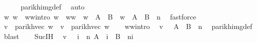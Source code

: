 \begin{isabellebody}
\ \ \ \ \isamarkupfalse%
\ parikh{\isacharunderscore}{\kern0pt}img{\isacharunderscore}{\kern0pt}def\ \isamarkupfalse%
\ auto\isanewline
\ \ \isamarkupfalse%
\ \isamarkupfalse%
\ w{}\ w{}\ \ w{}{\isacharunderscore}{\kern0pt}w{}{\isacharunderscore}{\kern0pt}intro{\isacharcolon}{\kern0pt}\ {\isachardoublequoteopen}w\ {\isacharequal}{\kern0pt}\ w{}{\isacharat}{\kern0pt}w{}\ {\isasymand}\ w{}\ {\isasymin}\ A\ {\isasymunion}\ B\ {\isasymand}\ w{}\ {\isasymin}\ {\isacharparenleft}{\kern0pt}A\ {\isasymunion}\ B{\isacharparenright}{\kern0pt}\ {\isacharcircum}{\kern0pt}{\isacharcircum}{\kern0pt}\ n{\isachardoublequoteclose}\ \isamarkupfalse%
\ fastforce\isanewline
\ \ \isamarkupfalse%
\ {\isacharquery}{\kern0pt}v{}\ {\isacharequal}{\kern0pt}\ {\isachardoublequoteopen}parikh{\isacharunderscore}{\kern0pt}vec\ w{}{\isachardoublequoteclose}\ \ {\isacharquery}{\kern0pt}v{}\ {\isacharequal}{\kern0pt}\ {\isachardoublequoteopen}parikh{\isacharunderscore}{\kern0pt}vec\ w{}{\isachardoublequoteclose}\isanewline
\ \ \isamarkupfalse%
\ w{}{\isacharunderscore}{\kern0pt}w{}{\isacharunderscore}{\kern0pt}intro\ \isamarkupfalse%
\ {\isachardoublequoteopen}{\isacharquery}{\kern0pt}v{}\ {\isasymin}\ {\isasymPsi}\ {\isacharparenleft}{\kern0pt}{\isacharparenleft}{\kern0pt}A\ {\isasymunion}\ B{\isacharparenright}{\kern0pt}\ {\isacharcircum}{\kern0pt}{\isacharcircum}{\kern0pt}\ n{\isacharparenright}{\kern0pt}{\isachardoublequoteclose}\ \isamarkupfalse%
\ parikh{\isacharunderscore}{\kern0pt}img{\isacharunderscore}{\kern0pt}def\ \isamarkupfalse%
\ blast\isanewline
\ \ \isamarkupfalse%
\ Suc{\isachardot}{\kern0pt}IH\ \isamarkupfalse%
\ {\isachardoublequoteopen}{\isacharquery}{\kern0pt}v{}\ {\isasymin}\ {\isasymPsi}\ {\isacharparenleft}{\kern0pt}{\isasymUnion}i\ {\isasymle}\ n{\isachardot}{\kern0pt}\ A\ {\isacharcircum}{\kern0pt}{\isacharcircum}{\kern0pt}\ i\ {\isacharat}{\kern0pt}{\isacharat}{\kern0pt}\ B\ {\isacharcircum}{\kern0pt}{\isacharcircum}{\kern0pt}\ {\isacharparenleft}{\kern0pt}n{\isacharminus}{\kern0pt}i{\isacharparenright}{\kern0pt}{\isacharparenright}{\kern0pt}{\isachardoublequoteclose}\ \isamarkupfalse%

\end{isabellebody}
